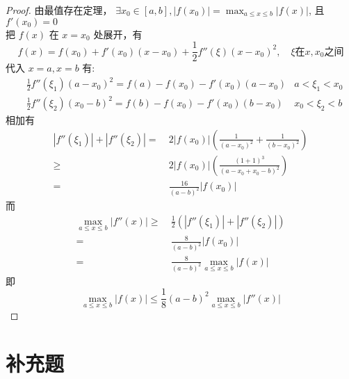 \documentclass{article}
\begin{document}
\begin{proof}
    由最值存在定理， $\exists x_0 \in [a, b], \left\lvert f(x_0)\right\rvert = \max_{a \leqslant x \leqslant b}\left\lvert f(x)\right\rvert$, 且 $f'(x_0) = 0$ \\
    把 $f(x)$ 在 $x = x_0$ 处展开，有
    \[
        f(x) = f(x_0) + f'(x_0)(x - x_0) + \frac{1}{2}f''(\xi)(x - x_0)^2, \quad \xi \text{在} x, x_0 \text{之间}
    \]
    代入 $x = a, x = b$ 有:
    \begin{align*}
        & \frac{1}{2}f''(\xi_1)(a - x_0)^2 = f(a) - f(x_0) - f'(x_0)(a - x_0) & a < \xi_1 < x_0 \\
        & \frac{1}{2}f''(\xi_2)(x_0 - b)^2 = f(b) - f(x_0) - f'(x_0)(b - x_0) & x_0 < \xi_2 < b
    \end{align*}
    相加有
    \begin{align*}
        \left\lvert f''(\xi_1)\right\rvert  + \left\lvert f''(\xi_2)\right\rvert  =\  & 2\left\lvert f(x_0)\right\rvert \left(\frac{1}{(a - x_0)^2} + \frac{1}{(b - x_0)^2}\right) \\
        \geqslant \ & 2\left\lvert f(x_0)\right\rvert\left(\frac{(1 + 1)^3}{(a - x_0 + x_0 - b)^2}\right)\\
        = \ & \frac{16}{(a - b)^2}\left\lvert f(x_0)\right\rvert
    \end{align*}
    而
    \begin{align*}
        \max_{a \leqslant x \leqslant b}\left\lvert f''(x)\right\rvert  \geqslant\ & \frac{1}{2}\left(\left\lvert f''(\xi_1)\right\rvert  + \left\lvert f''(\xi_2)\right\rvert\right) \\
        = \ & \frac{8}{(a - b)^2}\left\lvert f(x_0)\right\rvert \\
        = \ & \frac{8}{(a - b)^2}\max_{a \leqslant x \leqslant b}\left\lvert f(x)\right\rvert
    \end{align*}
    即 \[\max_{a \leqslant x \leqslant b}\left\lvert f(x)\right\rvert \leqslant \frac{1}{8}(a - b)^2\max_{a \leqslant x \leqslant b}\left\lvert f''(x)\right\rvert \]
\end{proof}

\section*{补充题}
\end{document}
